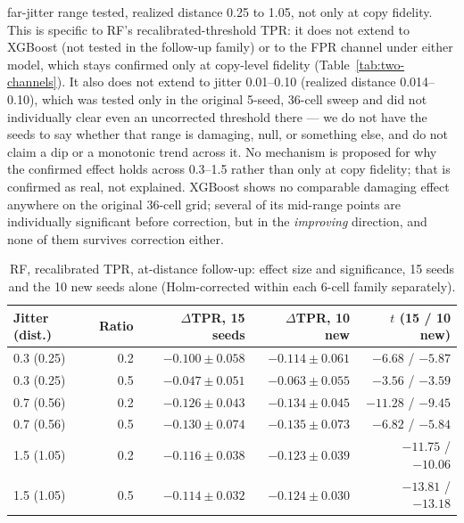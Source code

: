 far-jitter range tested,
realized distance 0.25 to 1.05, not only at copy fidelity. This is specific to RF's
recalibrated-threshold TPR: it does not extend to XGBoost (not tested in the follow-up family) or
to the FPR channel under either model, which stays confirmed only at copy-level fidelity
(Table~\ref{tab:two-channels}). It also does not extend to jitter 0.01--0.10 (realized distance
0.014--0.10), which was tested only in the original 5-seed, 36-cell sweep and did not individually
clear even an uncorrected threshold there — we do not have the seeds to say whether that range is
damaging, null, or something else, and do not claim a dip or a monotonic trend across it. No
mechanism is proposed for why the confirmed effect holds across 0.3--1.5 rather than only at copy
fidelity; that is confirmed as real, not explained. XGBoost shows no comparable damaging effect
anywhere on the original 36-cell grid; several of its mid-range points are individually
significant before correction, but in the \emph{improving} direction, and none of them survives
correction either.

\begin{table}[t]
  \centering
  \caption{RF, recalibrated TPR, at-distance follow-up: effect size and significance, 15 seeds
  and the 10 new seeds alone (Holm-corrected within each 6-cell family separately).}
  \label{tab:distance-followup}
  \small
  \begin{tabular}{lrrrr}
    \toprule
    Jitter (dist.) & Ratio & $\Delta$TPR, 15 seeds & $\Delta$TPR, 10 new & $t$ (15 / 10 new) \\
    \midrule
    0.3 (0.25) & 0.2 & $-0.100\pm0.058$ & $-0.114\pm0.061$ & $-6.68$ / $-5.87$ \\
    0.3 (0.25) & 0.5 & $-0.047\pm0.051$ & $-0.063\pm0.055$ & $-3.56$ / $-3.59$ \\
    0.7 (0.56) & 0.2 & $-0.126\pm0.043$ & $-0.134\pm0.045$ & $-11.28$ / $-9.45$ \\
    0.7 (0.56) & 0.5 & $-0.130\pm0.074$ & $-0.135\pm0.073$ & $-6.82$ / $-5.84$ \\
    1.5 (1.05) & 0.2 & $-0.116\pm0.038$ & $-0.123\pm0.039$ & $-11.75$ / $-10.06$ \\
    1.5 (1.05) & 0.5 & $-0.114\pm0.032$ & $-0.124\pm0.030$ & $-13.81$ / $-13.18$ \\
    \bottomrule
  \end{tabular}
\end{table}


